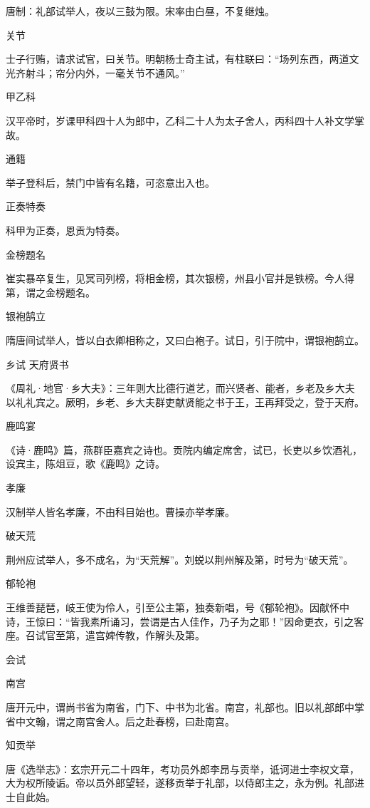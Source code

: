 \documentclass[a4paper,12pt,UTF8,twoside]{ctexbook}
\begin{document}
    唐制：礼部试举人，夜以三鼓为限。宋率由白昼，不复继烛。
    
    关节
    
    士子行贿，请求试官，曰关节。明朝杨士奇主试，有柱联曰：“场列东西，两道文光齐射斗；帘分内外，一毫关节不通风。”
    
    甲乙科
    
    汉平帝时，岁课甲科四十人为郎中，乙科二十人为太子舍人，丙科四十人补文学掌故。
    
    通籍
    
    举子登科后，禁门中皆有名籍，可恣意出入也。
    
    正奏特奏
    
    科甲为正奏，恩贡为特奏。
    
    金榜题名
    
    崔实暴卒复生，见冥司列榜，将相金榜，其次银榜，州县小官并是铁榜。今人得第，谓之金榜题名。
    
    银袍鹄立
    
    隋唐间试举人，皆以白衣卿相称之，又曰白袍子。试日，引于院中，谓银袍鹄立。
    
    乡试
    天府贤书
    
    《周礼·地官·乡大夫》：三年则大比德行道艺，而兴贤者、能者，乡老及乡大夫以礼礼宾之。厥明，乡老、乡大夫群吏献贤能之书于王，王再拜受之，登于天府。
    
    鹿鸣宴
    
    《诗·鹿鸣》篇，燕群臣嘉宾之诗也。贡院内编定席舍，试已，长吏以乡饮酒礼，设宾主，陈俎豆，歌《鹿鸣》之诗。
    
    孝廉
    
    汉制举人皆名孝廉，不由科目始也。曹操亦举孝廉。
    
    破天荒
    
    荆州应试举人，多不成名，为“天荒解”。刘蜕以荆州解及第，时号为“破天荒”。
    
    郁轮袍
    
    王维善琵琶，岐王使为伶人，引至公主第，独奏新唱，号《郁轮袍》。因献怀中诗，王惊曰：“皆我素所诵习，尝谓是古人佳作，乃子为之耶！”因命更衣，引之客座。召试官至第，遣宫婢传教，作解头及第。
    
    会试
    
    南宫
    
    唐开元中，谓尚书省为南省，门下、中书为北省。南宫，礼部也。旧以礼部郎中掌省中文翰，谓之南宫舍人。后之赴春榜，曰赴南宫。
    
    知贡举
    
    唐《选举志》：玄宗开元二十四年，考功员外郎李昂与贡举，诋诃进士李权文章，大为权所陵诟。帝以员外郎望轻，遂移贡举于礼部，以侍郎主之，永为例。礼部进士自此始。
    
\end{document}
